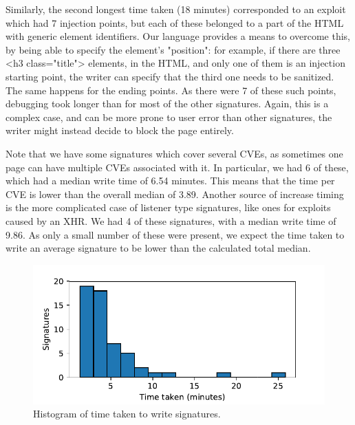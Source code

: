 Similarly, the second longest time taken (18 minutes) corresponded to an exploit which had 7 injection points, but each of these belonged to a part of the HTML with generic element identifiers. Our language provides a means to overcome this, by being able to specify the element's "position": for example, if there are three <h3 class="title"> elements, in the HTML, and only one of them is an injection starting point, the writer can specify that the third one needs to be sanitized. The same happens for the ending points. As there were 7 of these such points, debugging took longer than for most of the other signatures. Again, this is a complex case, and can be more prone to user error than other signatures, the writer might instead decide to block the page entirely.

Note that we have some signatures which cover several CVEs, as sometimes one page can have multiple CVEs associated with it. In particular, we had 6 of these, which had a median write time of 6.54 minutes. This means that the time per CVE is lower than the overall median of 3.89. Another source of increase timing is the more complicated case of listener type signatures, like ones for exploits caused by an XHR. We had 4 of these signatures, with a median write time of 9.86. As only a small number of these were present, we expect the time taken to write an average signature to be lower than the calculated total median.

\begin{figure}[h]
	\begin{center}
	\includegraphics[width=\linewidth]{results/signature_times_small.pdf}
	\caption{Histogram of time taken to write signatures.}
	\label{fig:signature_times}
	\end{center}
\end{figure}


